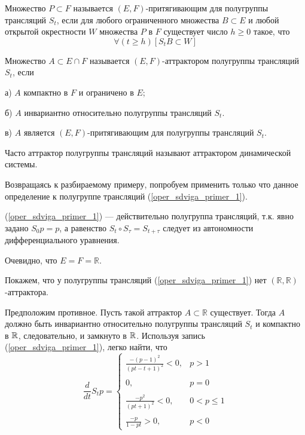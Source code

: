 \opred

Множество $P \subset F$ называется $(E,F)$-притягивающим для полугруппы трансляций $S_t$,
если для любого ограниченного множества $B \subset E$ и любой открытой окрестности $W$ множества $P$ в $F$ существует число $h\geq 0$ такое, что
$$
	\forall(t \geq h)[S_t B \subset W]
$$


\opred

Множество $A\subset E\cap F$ называется $(E,F)$-аттрактором полугруппы трансляций $S_t$, если

а) $A$ компактно в $F$ и ограничено в $E$;

б) $A$ инвариантно относительно полугруппы трансляций $S_t$.

в) $A$ является $(E,F)$-притягивающим для полугруппы трансляций $S_t$.

Часто аттрактор полугруппы трансляций называют аттрактором динамической системы.

Возвращаясь к разбираемому примеру, попробуем применить только что данное определение к полугруппе трансляций (\ref{oper_sdviga_primer_1}).

(\ref{oper_sdviga_primer_1}) --- действительно полугруппа трансляций, т.к. явно задано $S_0 p = p$, а равенство $S_t \circ S_\tau = S_{t+\tau}$ следует из автономности дифференциального уравнения.

Очевидно, что $E=F=\mathbb{R}$.

Покажем, что у полугруппы трансляций (\ref{oper_sdviga_primer_1}) нет $(\mathbb{R},\mathbb{R})$-аттрактора.

Предположим противное.
Пусть такой аттрактор $A \subset \mathbb{R}$ существует.
Тогда $A$ должно быть инвариантно относительно полугруппы трансляций $S_t$ и компактно в $\mathbb{R}$, следовательно, и замкнуто в $\mathbb{R}$.
Используя запись (\ref{oper_sdviga_primer_1}), легко найти, что
\begin{equation}\label{oper_sdviga_primer_1_proizv}
	\frac{d}{dt}S_t p =
	\left\{
		\begin{array}{ll}
			\frac{-(p-1)^2}{(pt-t+1)^2} < 0, & p > 1
		\\\\
			0,        & p = 0
		\\\\
			\frac{-p^2}{(pt+1)^2} < 0,        & 0 < p \leq 1
		\\\\
			\frac{-p}{1 - pt} > 0,      & p < 0
		\end{array}
	\right.
\end{equation}

